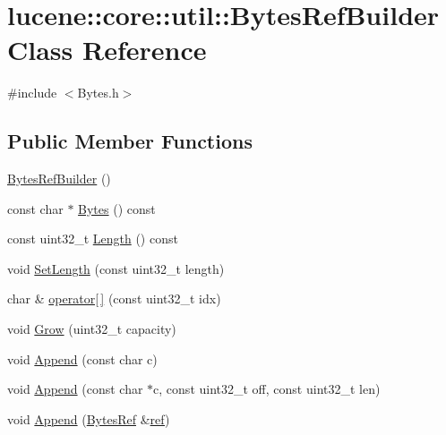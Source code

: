 \hypertarget{classlucene_1_1core_1_1util_1_1BytesRefBuilder}{}\section{lucene\+:\+:core\+:\+:util\+:\+:Bytes\+Ref\+Builder Class Reference}
\label{classlucene_1_1core_1_1util_1_1BytesRefBuilder}


{\ttfamily \#include $<$Bytes.\+h$>$}

\subsection*{Public Member Functions}
\begin{DoxyCompactItemize}
\item 
\mbox{\hyperlink{classlucene_1_1core_1_1util_1_1BytesRefBuilder_aa5856f8432f1ec902dec8878870172a1}{Bytes\+Ref\+Builder}} ()
\item 
const char $\ast$ \mbox{\hyperlink{classlucene_1_1core_1_1util_1_1BytesRefBuilder_adfb83526efdddf117d04ca09ee969a60}{Bytes}} () const
\item 
const uint32\+\_\+t \mbox{\hyperlink{classlucene_1_1core_1_1util_1_1BytesRefBuilder_aa7bd448382bd0a354c6f6ba60a59e8ac}{Length}} () const
\item 
void \mbox{\hyperlink{classlucene_1_1core_1_1util_1_1BytesRefBuilder_a34ba90028288970e12074c73f83fac35}{Set\+Length}} (const uint32\+\_\+t length)
\item 
char \& \mbox{\hyperlink{classlucene_1_1core_1_1util_1_1BytesRefBuilder_aa071988e7fc86a21eb471e1e1d7175c5}{operator\mbox{[}$\,$\mbox{]}}} (const uint32\+\_\+t idx)
\item 
void \mbox{\hyperlink{classlucene_1_1core_1_1util_1_1BytesRefBuilder_a2a7eb7513a56413771e240c119d6f5df}{Grow}} (uint32\+\_\+t capacity)
\item 
void \mbox{\hyperlink{classlucene_1_1core_1_1util_1_1BytesRefBuilder_a8bd34d12e0ae6cac0ae2e44d6c127102}{Append}} (const char c)
\item 
void \mbox{\hyperlink{classlucene_1_1core_1_1util_1_1BytesRefBuilder_a48f1ebac7ad7a3ee8aa359f9428a6b31}{Append}} (const char $\ast$c, const uint32\+\_\+t off, const uint32\+\_\+t len)
\item 
void \mbox{\hyperlink{classlucene_1_1core_1_1util_1_1BytesRefBuilder_a7fef66bf06e6ba21cbd4036febbb4326}{Append}} (\mbox{\hyperlink{classlucene_1_1core_1_1util_1_1BytesRef}{Bytes\+Ref}} \&\mbox{\hyperlink{classlucene_1_1core_1_1util_1_1BytesRefBuilder_ad6f2fc3362182886584f9c3a5fcb9a56}{ref}})

\end{DoxyCompactItemize}
